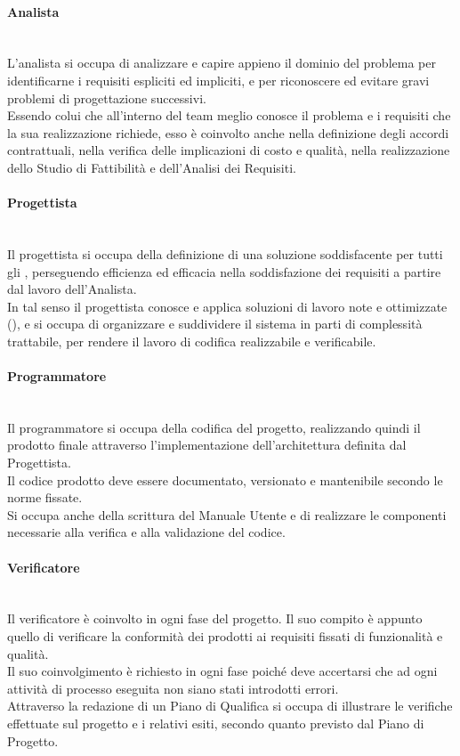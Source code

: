     \paragraph{Analista}
    ~\\L'analista si occupa di analizzare e capire appieno il dominio del problema per identificarne i requisiti espliciti ed impliciti, e per riconoscere ed evitare gravi problemi di progettazione successivi.
    \\Essendo colui che all'interno del team meglio conosce il problema e i requisiti che la sua realizzazione richiede, esso è coinvolto anche nella definizione degli accordi contrattuali, nella verifica delle implicazioni di costo e qualità, nella realizzazione dello Studio di Fattibilità e dell'Analisi dei Requisiti.
    \paragraph{Progettista}
    ~\\Il progettista si occupa della definizione di una soluzione soddisfacente per tutti gli , perseguendo efficienza ed efficacia nella soddisfazione dei requisiti a partire dal lavoro dell'Analista.
    \\In tal senso il progettista conosce e applica soluzioni di lavoro note e ottimizzate (), e si occupa di organizzare e suddividere il sistema in parti di complessità trattabile, per rendere il lavoro di codifica realizzabile e verificabile.
    \paragraph{Programmatore}
    ~\\Il programmatore si occupa della codifica del progetto, realizzando quindi il prodotto finale attraverso l'implementazione dell'architettura definita dal Progettista.
    \\Il codice prodotto deve essere documentato, versionato e mantenibile secondo le norme fissate.
    \\Si occupa anche della scrittura del Manuale Utente e di realizzare le componenti necessarie alla verifica e alla validazione del codice.
    \paragraph{Verificatore}
    ~\\Il verificatore è coinvolto in ogni fase del progetto. Il suo compito è appunto quello di verificare la conformità dei prodotti ai requisiti fissati di funzionalità e qualità.
    \\Il suo coinvolgimento è richiesto in ogni fase poiché deve accertarsi che ad ogni attività di processo eseguita non siano stati introdotti errori.
    \\Attraverso la redazione di un Piano di Qualifica si occupa di illustrare le verifiche effettuate sul progetto e i relativi esiti, secondo quanto previsto dal Piano di Progetto.
